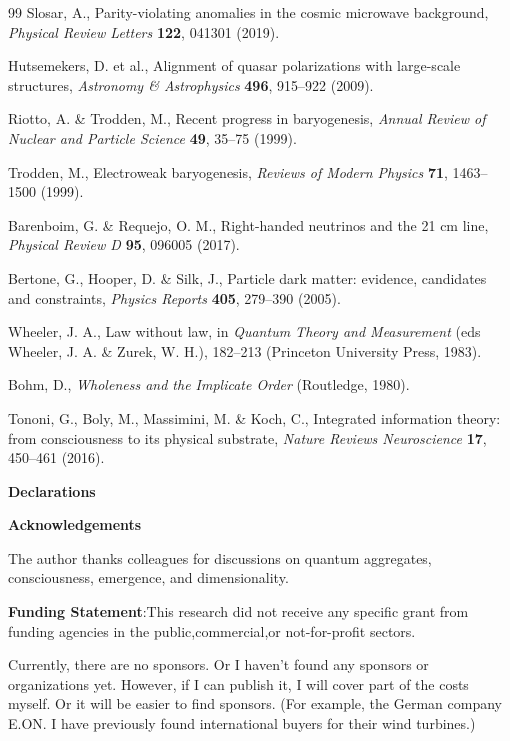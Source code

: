 \documentclass[twocolumn,11pt,a4paper]{article}
\begin{document}
\begin{thebibliography}{99}
Slosar, A., Parity-violating anomalies in the cosmic microwave background, \textit{Physical Review Letters} \textbf{122}, 041301 (2019).

Hutsemekers, D. et al., Alignment of quasar polarizations with large-scale structures, \textit{Astronomy \& Astrophysics} \textbf{496}, 915--922 (2009).

Riotto, A. \& Trodden, M., Recent progress in baryogenesis, \textit{Annual Review of Nuclear and Particle Science} \textbf{49}, 35--75 (1999).

Trodden, M., Electroweak baryogenesis, \textit{Reviews of Modern Physics} \textbf{71}, 1463--1500 (1999).

Barenboim, G. \& Requejo, O. M., Right-handed neutrinos and the 21 cm line, \textit{Physical Review D} \textbf{95}, 096005 (2017).

Bertone, G., Hooper, D. \& Silk, J., Particle dark matter: evidence, candidates and constraints, \textit{Physics Reports} \textbf{405}, 279--390 (2005).

Wheeler, J. A., Law without law, in \textit{Quantum Theory and Measurement} (eds Wheeler, J. A. \& Zurek, W. H.), 182--213 (Princeton University Press, 1983).

Bohm, D., \textit{Wholeness and the Implicate Order} (Routledge, 1980).

Tononi, G., Boly, M., Massimini, M. \& Koch, C., Integrated information theory: from consciousness to its physical substrate, \textit{Nature Reviews Neuroscience} \textbf{17}, 450--461 (2016).

\end{thebibliography}
\textbf{\textbf{Declarations}}

  
  
  \textbf{\textbf{Acknowledgements}}

The author thanks colleagues for discussions on quantum aggregates, consciousness, emergence, and dimensionality. 

 \textbf{\textbf{Funding Statement}}:This research did not receive any specific grant from funding agencies in the public,commercial,or not-for-profit sectors.

Currently, there are no sponsors. Or I haven't found any sponsors or organizations yet. However, if I can publish it, I will cover part of the costs myself. Or it will be easier to find sponsors. (For example, the German company E.ON. I have previously found international buyers for their wind turbines.)
\end{document}
